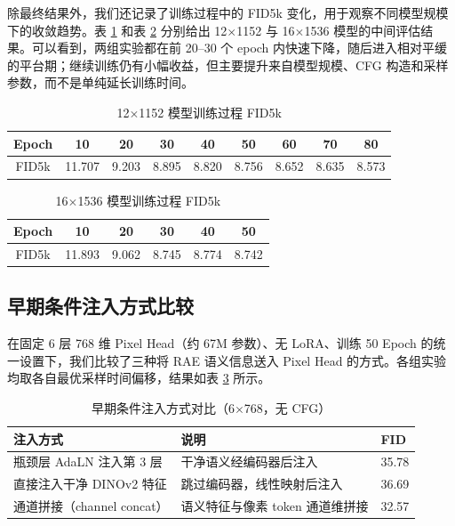 \documentclass[11pt]{article}
\begin{document}
除最终结果外，我们还记录了训练过程中的 FID5k 变化，用于观察不同模型规模下的收敛趋势。表 \ref{tab:train-curve-1152} 和表 \ref{tab:train-curve-1536} 分别给出 12$\times$1152 与 16$\times$1536 模型的中间评估结果。可以看到，两组实验都在前 20--30 个 epoch 内快速下降，随后进入相对平缓的平台期；继续训练仍有小幅收益，但主要提升来自模型规模、CFG 构造和采样参数，而不是单纯延长训练时间。

\begin{table}[H]
\centering
\caption{12$\times$1152 模型训练过程 FID5k}
\label{tab:train-curve-1152}
\begin{tabular}{ccccccccc}
\toprule
Epoch & 10 & 20 & 30 & 40 & 50 & 60 & 70 & 80 \\
\midrule
FID5k & 11.707 & 9.203 & 8.895 & 8.820 & 8.756 & 8.652 & 8.635 & 8.573 \\
\bottomrule
\end{tabular}
\end{table}

\begin{table}[H]
\centering
\caption{16$\times$1536 模型训练过程 FID5k}
\label{tab:train-curve-1536}
\begin{tabular}{cccccc}
\toprule
Epoch & 10 & 20 & 30 & 40 & 50 \\
\midrule
FID5k & 11.893 & 9.062 & 8.745 & 8.774 & 8.742 \\
\bottomrule
\end{tabular}
\end{table}

\subsection{早期条件注入方式比较}
\label{app:inject-details}

在固定 6 层 768 维 Pixel Head（约 67M 参数）、无 LoRA、训练 50 Epoch 的统一设置下，我们比较了三种将 RAE 语义信息送入 Pixel Head 的方式。各组实验均取各自最优采样时间偏移，结果如表 \ref{tab:inject-ablation} 所示。

\begin{table}[H]
\centering
\caption{早期条件注入方式对比（6$\times$768，无 CFG）}
\label{tab:inject-ablation}
\begin{tabular}{lll}
\toprule
注入方式 & 说明 & FID \\
\midrule
瓶颈层 AdaLN 注入第 3 层 & 干净语义经编码器后注入 & 35.78 \\
直接注入干净 DINOv2 特征 & 跳过编码器，线性映射后注入 & 36.69 \\
通道拼接（channel concat） & 语义特征与像素 token 通道维拼接 & 32.57 \\
\bottomrule
\end{tabular}
\end{table}
\end{document}
